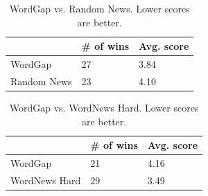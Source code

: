 

\begin{table}[th]
    \caption{WordGap vs. Random News.  Lower scores are better.}
    \label{table:distractor_1}
    \begin{center}
    \begin{tabular}{| p{2.5cm} | p{1.5cm} | p{1.8cm} |}
        \hline
         & {\bf \# of wins} & {\bf Avg. score}\\
        \hline
        WordGap & 27 & 3.84\\
        \hline
        Random News & 23 & 4.10\\
        \hline
    \end{tabular}
    \end{center}
\end{table}

\begin{table}[th]
    \caption{WordGap vs. WordNews Hard.  Lower scores are better.}
    \label{table:distractor_2}
    \begin{center}
    \begin{tabular}{| p{2.6cm} | p{1.5cm} | p{1.8cm} |}
        \hline
         & {\bf \# of wins} & {\bf Avg. score}\\
        \hline
        WordGap & 21 & 4.16\\
        \hline
        WordNews Hard & 29 & 3.49\\
        \hline
    \end{tabular}
    \end{center}
\end{table}


